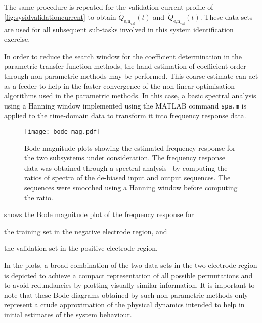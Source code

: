 The        same        procedure        is        repeated        for        the
validation       current      profile       of \cref{fig:sysidvalidationcurrent}
to         obtain         $\widetilde{Q}_{\text{e,n}_\text{val}}(t)$         and~$\widetilde{Q}_{\text{e,n}_\text{val}}(t)$.  These data  sets are  used for  all
subsequent sub-tasks involved in this system identification exercise.

In  order to  reduce  the search  window for  the  coefficient determination  in
the  parametric transfer  function methods,  the hand-estimation  of coefficient
order  through non-parametric  methods may  be performed.  This coarse  estimate
can  act as  a  feeder to  help  in  the faster  convergence  of the  non-linear
optimisation algorithms  used in the parametric  methods. In this case,  a basic
spectral analysis  using a Hanning  window implemented using the  MATLAB command
\texttt{spa.m} is applied to the time-domain data to transform it into frequency
response data.

\begin{figure}[!htbp]
    \centering
    \texttt{[image: bode\_mag.pdf]}
    \caption[Bode magnitude plots of the electrolyte time-evolution sub-systems]{%
        Bode magnitude  plots showing the  estimated frequency response  for the
        two  subsystems under  consideration.  The frequency  response data  was
        obtained  through a spectral  analysis \ie~by computing  the ratios  of
        spectra of the de-biased input  and output sequences. The sequences were
        smoothed using a Hanning window before computing the ratio.
    }%
    \label{fig:initialbodemag}
\end{figure}

  shows  the  Bode  magnitude  plot  of  the  frequency
response for
\begin{enumerate*}[label=\emph{\alph*})]
    \item the training set in the negative electrode region, and
    \item the validation set in the positive electrode region.
\end{enumerate*}
In the  plots, a broad  combination of  the two data  sets in the  two electrode
region  is  depicted  to  achieve  a  compact  representation  of  all  possible
permutations and to avoid redundancies by plotting visually similar information.
It is important to note that these Bode diagrams obtained by such non-parametric
methods only represent  a crude approximation of the  physical dynamics intended
to help in initial estimates of the system behaviour.

